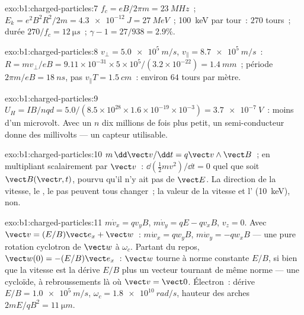 \begin{solution}{exo:b1:charged-particles:7}
$f_c = eB/2\pi m = \qty{23}{MHz}$~; $E_k = e^2B^2R^2/2m = \qty{4.3e-12}{J} =
\qty{27}{MeV}$~; \qty{100}{keV} par tour~: $270$ tours~; durée $270/f_c =
\qty{12}{\micro s}$~; $\gamma - 1 = 27/938 = 2.9\%$.
\end{solution}

\begin{solution}{exo:b1:charged-particles:8}
$v_\perp = \qty{5.0e5}{m/s}$, $v_\parallel = \qty{8.7e5}{m/s}$~: $R = mv_\perp/eB
= 9.11\times10^{-31} \times 5\times10^5/(3.2\times10^{-22}) = \qty{1.4}{mm}$~;
période $2\pi m/eB = \qty{18}{ns}$, pas $v_\parallel T = \qty{1.5}{cm}$~:
environ $64$ tours par mètre.
\end{solution}

\begin{solution}{exo:b1:charged-particles:9}
$U_H = IB/nqd = 5.0/(8.5\times10^{28} \times 1.6\times10^{-19} \times 10^{-3})
= \qty{3.7e-7}{V}$~: moins d'un microvolt. Avec un $n$ dix millions de
fois plus petit, un semi-conducteur donne des millivolts --- un capteur utilisable.
\end{solution}

\begin{solution}{exo:b1:charged-particles:10}
$m\,\dd\vect v/\dd t = q\vect v\wedge\vect B$~; en multipliant scalairement par $\vect v$~: $\dd(\tfrac12 mv^2)/
\dd t = 0$ quel que soit $\vect B(\vect r, t)$, pourvu qu'il n'y ait pas de $\vect E$. La
direction de la vitesse, le , le pas peuvent tous
changer~; la valeur de la vitesse et l' (\qty{10}{keV}), non.
\end{solution}

\begin{solution}{exo:b1:charged-particles:11}
$m\dot v_x = qv_yB$, $m\dot v_y = qE - qv_xB$, $v_z = 0$. Avec $\vect v =
(E/B)\vect e_x + \vect w$~: $m\dot w_x = qw_yB$, $m\dot w_y = -qw_xB$ --- une
pure rotation cyclotron de $\vect w$ à $\omega_c$. Partant du repos,
$\vect w(0) = -(E/B)\vect e_x$~: $\vect w$ tourne à norme constante $E/B$, si bien que la
vitesse est la dérive $E/B$ plus un vecteur tournant de même norme ---
une cycloïde, à rebroussements là où $\vect v = \vect 0$. Électron~: dérive $E/B =
\qty{1.0e5}{m/s}$, $\omega_c = \qty{1.8e10}{rad/s}$, hauteur des arches $2mE/qB^2 =
\qty{11}{\micro m}$.
\end{solution}

